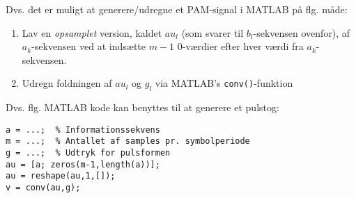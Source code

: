 \documentclass[dvips,11pt,a4paper]{article}
\begin{document}
\noindent{}Dvs. det er muligt at generere/udregne et PAM-signal i MATLAB på flg. måde:
\begin{enumerate}
\item Lav en \emph{opsamplet} version, kaldet $au_l$ (som svarer til $b_l$-sekvensen ovenfor), af $a_k$-sekvensen ved at indsætte $m-1$ 0-værdier efter hver værdi fra $a_k$-sekvensen.
\item Udregn foldningen af $au_l$ og $g_l$ via MATLAB's \texttt{conv()}-funktion
\end{enumerate}

\noindent{}Dvs. flg. MATLAB kode kan benyttes til at generere et pulstog:
\begin{verbatim}
a = ...;  % Informationssekvens
m = ...;  % Antallet af samples pr. symbolperiode
g = ...;  % Udtryk for pulsformen
au = [a; zeros(m-1,length(a))];
au = reshape(au,1,[]);
v = conv(au,g);
\end{verbatim}

\noindent{}
\end{document}
